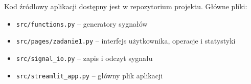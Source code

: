 \documentclass[12pt]{article}
\begin{document}
Kod źródłowy aplikacji dostępny jest w repozytorium projektu.
Główne pliki:

\begin{itemize}
  \item \texttt{src/functions.py} -- generatory sygnałów
  \item \texttt{src/pages/zadanie1.py} -- interfejs użytkownika, operacje i statystyki
  \item \texttt{src/signal\_io.py} -- zapis i odczyt sygnału
  \item \texttt{src/streamlit\_app.py} -- główny plik aplikacji
\end{itemize}

\renewcommand\refname{Bibliografia}


\end{document}

